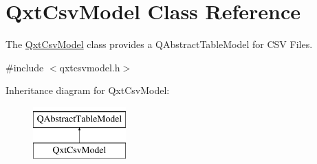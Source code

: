 \hypertarget{class_qxt_csv_model}{\section{Qxt\-Csv\-Model Class Reference}
\label{class_qxt_csv_model}
}


The \hyperlink{class_qxt_csv_model}{Qxt\-Csv\-Model} class provides a Q\-Abstract\-Table\-Model for C\-S\-V Files.  




{\ttfamily \#include $<$qxtcsvmodel.\-h$>$}

Inheritance diagram for Qxt\-Csv\-Model\-:\begin{figure}[H]
\begin{center}
\leavevmode
\includegraphics[height=2.000000cm]{class_qxt_csv_model}
\end{center}
\end{figure}
